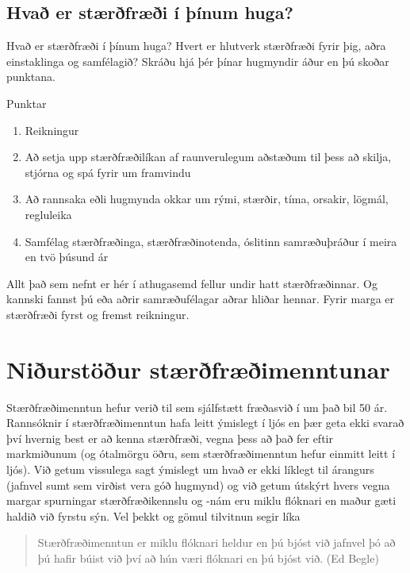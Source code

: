 \documentclass[
  icelandic,
]{book}
\providecommand{\tightlist}{%
  \setlength{\itemsep}{0pt}\setlength{\parskip}{0pt}}
\theoremstyle{definition}
\theoremstyle{definition}
\theoremstyle{definition}
\theoremstyle{definition}
\theoremstyle{remark}
\begin{document}
\subsection{Hvað er stærðfræði í þínum huga?}\label{stae-thinum-huga}

Hvað er stærðfræði í þínum huga? Hvert er hlutverk stærðfræði fyrir þig, aðra einstaklinga og samfélagið? Skráðu hjá þér þínar hugmyndir áður en þú skoðar punktana.

Punktar

\begin{enumerate}
\def\labelenumi{\alph{enumi}.}
\tightlist
\item
  Reikningur
\item
  Að setja upp stærðfræðilíkan af raunverulegum aðstæðum til þess að skilja, stjórna og spá fyrir um framvindu
\item
  Að rannsaka eðli hugmynda okkar um rými, stærðir, tíma, orsakir, lögmál, regluleika
\item
  Samfélag stærðfræðinga, stærðfræðinotenda, óslitinn samræðuþráður í meira en tvö þúsund ár
\end{enumerate}

Allt það sem nefnt er hér í athugasemd fellur undir hatt stærðfræðinnar. Og kannski fannst þú eða aðrir samræðufélagar aðrar hliðar hennar. Fyrir marga er stærðfræði fyrst og fremst reikningur.

\section{Niðurstöður stærðfræðimenntunar}\label{staemennt-statements}

Stærðfræðimenntun hefur verið til sem sjálfstætt fræðasvið í um það bil 50 ár. Rannsóknir í stærðfræðimenntun hafa leitt ýmislegt í ljós en þær geta ekki svarað því hvernig best er að kenna stærðfræði, vegna þess að það fer eftir markmiðunum (og ótalmörgu öðru, sem stærðfræðimenntun hefur einmitt leitt í ljós). Við getum vissulega sagt ýmislegt um hvað er ekki líklegt til árangurs (jafnvel sumt sem virðist vera góð hugmynd) og við getum útskýrt hvers vegna margar spurningar stærðfræðikennslu og -nám eru miklu flóknari en maður gæti haldið við fyrstu sýn. Vel þekkt og gömul tilvitnun segir líka

\begin{quote}
Stærðfræðimenntun er miklu flóknari heldur en þú bjóst við jafnvel þó að þú hafir búist við því að hún væri flóknari en þú bjóst við. (Ed Begle)
\end{quote}
\end{document}
